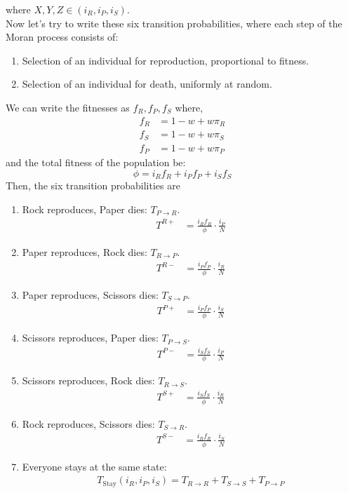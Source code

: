 \documentclass{article}
\begin{document}
where $X,Y,Z \in (i_R,i_P,i_S)$.\\
Now let's try to write these six transition probabilities,
where each step of the Moran process consists of:
\begin{enumerate}
\item Selection of an individual for reproduction, proportional to fitness.
\item Selection of an individual for death, uniformly at random.
\end{enumerate}
We can write the fitnesses as \( f_R, f_P, f_S \) where,
\begin{align}
f_R &= 1-w+w\pi_R \nonumber\\
f_S &= 1-w+w\pi_S \nonumber\\
f_P &= 1-w+w\pi_P \label{eq:41}
\end{align}
and the total fitness of the population be:
\begin{equation}
\phi = i_R f_R + i_P f_P + i_S f_S \label{eq:42}
\end{equation}
Then, the six transition probabilities are 
\begin{enumerate}
\item Rock reproduces, Paper dies: $T_{P \to R}$.
\begin{align}
T^{R+} &= \frac{i_R f_R}{\phi} \cdot \frac{i_P}{N} \label{eq:43}
\end{align}
\item Paper reproduces, Rock dies: $T_{R \to P}$.
\begin{align}
T^{R-} &= \frac{i_P f_P}{\phi} \cdot \frac{i_R}{N}\label{eq:44}
\end{align}
\item Paper reproduces, Scissors dies: $T_{S \to P}$.
\begin{align}
T^{P+} &= \frac{i_P f_P}{\phi} \cdot \frac{i_S}{N} \label{eq:45}
\end{align}
\item Scissors reproduces, Paper dies: $T_{P \to S}$.
\begin{align}
T^{P-} &= \frac{i_S f_S}{\phi} \cdot \frac{i_P}{N} \label{eq:46}
\end{align}
\item Scissors reproduces, Rock dies: $T_{R \to S}$.
\begin{align}
T^{S+} &= \frac{i_S f_S}{\phi} \cdot \frac{i_R}{N} \label{eq:47}
\end{align}
\item Rock reproduces, Scissors dies: $T_{S \to R}$.
\begin{align}
T^{S-} &= \frac{i_R f_R}{\phi} \cdot \frac{i_S}{N} \label{eq:48}
\end{align}
\item Everyone stays at the same state:
\begin{align}
T_{\text{Stay}}(i_R,i_P,i_S) = T_{R \to R} + T_{S \to S} + T_{P \to P} \label{eq:49}
\end{align}
\end{enumerate}
\end{document}
